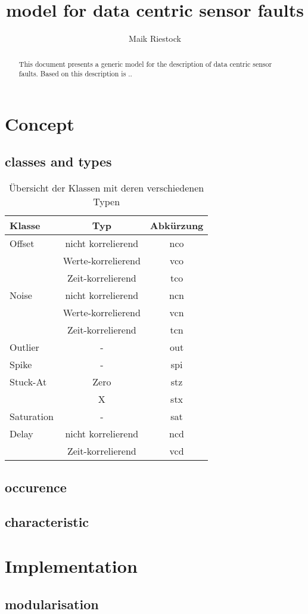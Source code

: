 \documentclass[a4paper,11pt]{article}
\title{model for data centric sensor faults}
\author{Maik Riestock}
\begin{document}
\maketitle
\tableofcontents

\begin{abstract}
This document presents a generic model for the description of data centric sensor faults. Based on this description is ..
\end{abstract}


\section{Concept}
 
\subsection{classes and types}  


\begin{table}[h]
    \begin{center}
        \begin{tabular}{l|cc}
		Klasse 		& Typ					& Abkürzung	\\
		\hline
		Offset		& nicht korrelierend	& nco	\\
					& Werte-korrelierend	& vco	\\
					& Zeit-korrelierend		& tco	\\
		Noise		& nicht korrelierend	& ncn	\\
					& Werte-korrelierend	& vcn	\\
					& Zeit-korrelierend		& tcn	\\								
		Outlier		& -						& out	\\		
		Spike		& -						& spi	\\
		Stuck-At	& Zero					& stz	\\
					& X						& stx	\\
		Saturation	& -						& sat	\\
		Delay		& nicht korrelierend	& ncd	\\
					& Zeit-korrelierend		& vcd	\\													
        \end{tabular}
        \caption[Übersicht der Fehlertypen]{Übersicht der Klassen mit deren verschiedenen Typen}
        \label{tab:typen}
    \end{center}
\end{table}

\subsection{occurence}

\subsection{characteristic}



\section{Implementation}

\subsection{modularisation}
\end{document}
